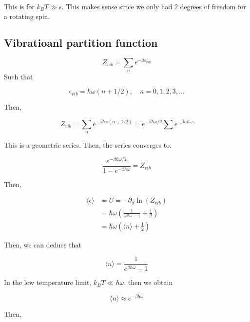 \documentclass{article}
\newtheorem{one minute paper}[theorem]{One Minute Paper}
\begin{document}
This is for $k_B T \gg \epsilon$. This makes sense since we only had 2 degrees of freedom for a rotating spin.

\subsection*{Vibratioanl partition function}

\begin{equation}
    Z_{vib} = \sum_{n}e^{-\beta \epsilon_{vib}}
\end{equation}
Such that 

\begin{equation}
    \epsilon_{vib} = \hbar \omega(n + 1/2), \quad n = 0,1,2,3,\dots
\end{equation}

Then, 

\begin{equation}
    Z_{vib} = \sum_n e^{-\beta\hbar \omega(n + 1/2)} = e^{-\beta \hbar\omega/2}\sum e^{-\beta n\hbar \omega}
\end{equation}

This is a geometric series. Then, the series converges to:

\begin{equation}
    \frac{e^{-\beta \hbar \omega/2}}{1 - e^{-\beta \hbar \omega}} = Z_{vib}
\end{equation}

Then, 

\begin{align}
    \langle \epsilon \rangle &= U = -\partial_{\beta}\ln\left( Z_{vib} \right) \\
    &= \hbar \omega \left( \frac{1}{e^{\beta \hbar \omega} - 1} + \frac{1}{2} \right) \\
    &= \hbar \omega \left( \langle n \rangle + \frac{1}{2} \right)
\end{align}

Then, we can deduce that 

\begin{equation}
    \langle n \rangle = \frac{1}{e^{\beta \hbar \omega} - 1}
\end{equation}

In the low temperature limit, $k_B T \ll \hbar \omega$, then we obtain 

\begin{equation}
    \langle n \rangle \approx e^{-\beta \hbar \omega}
\end{equation}

Then, 
\end{document}

